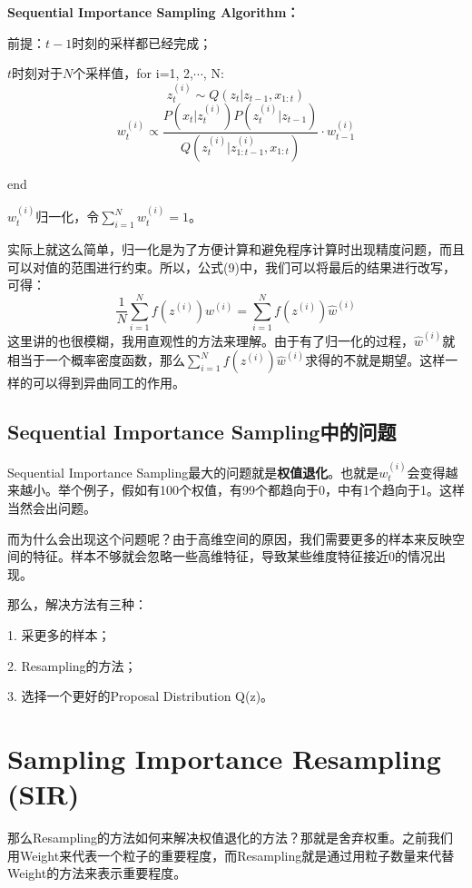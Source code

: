 \documentclass[a4paper]{article}
\begin{document}
\qquad \textbf{Sequential Importance Sampling Algorithm：}

\qquad 前提：$t-1$时刻的采样都已经完成；

\qquad $t$时刻对于$N$个采样值，for i=1, 2,$\cdots$, N:
\begin{equation}
    z_t^{(i)}\sim Q(z_t|z_{t-1},x_{1:t}) 
\end{equation}
\begin{equation}
    w_t^{(i)}  \propto  \frac{P(x_t|z_t^{(i)})P(z_t^{(i)}|z_{t-1})}{Q(z_t^{(i)}|z_{1:t-1}^{(i)},x_{1:t})} \cdot w^{(i)}_{t-1}
\end{equation}

\qquad end

\qquad $w^{(i)}_t$归一化，令$\sum_{i=1}^N w^{(i)}_t=1$。

实际上就这么简单，归一化是为了方便计算和避免程序计算时出现精度问题，而且可以对值的范围进行约束。所以，公式(9)中，我们可以将最后的结果进行改写，可得：
\begin{equation}
    \frac{1}{N}\sum_{i=1}^N f(z^{(i)})w^{(i)} = \sum_{i=1}^N f(z^{(i)})\hat{w}^{(i)}
\end{equation}
这里讲的也很模糊，我用直观性的方法来理解。由于有了归一化的过程，$\hat{w}^{(i)}$就相当于一个概率密度函数，那么$\sum_{i=1}^N f(z^{(i)})\hat{w}^{(i)}$求得的不就是期望。这样一样的可以得到异曲同工的作用。

\subsection{Sequential Importance Sampling中的问题}
Sequential Importance Sampling最大的问题就是\textbf{权值退化}。也就是$w^{(i)}_t$会变得越来越小。举个例子，假如有100个权值，有99个都趋向于0，中有1个趋向于1。这样当然会出问题。

而为什么会出现这个问题呢？由于高维空间的原因，我们需要更多的样本来反映空间的特征。样本不够就会忽略一些高维特征，导致某些维度特征接近0的情况出现。

那么，解决方法有三种：

1. 采更多的样本；

2. Resampling的方法；

3. 选择一个更好的Proposal Distribution Q(z)。

\section{Sampling Importance Resampling (SIR)}
那么Resampling的方法如何来解决权值退化的方法？那就是舍弃权重。之前我们用Weight来代表一个粒子的重要程度，而Resampling就是通过用粒子数量来代替Weight的方法来表示重要程度。
\end{document}
